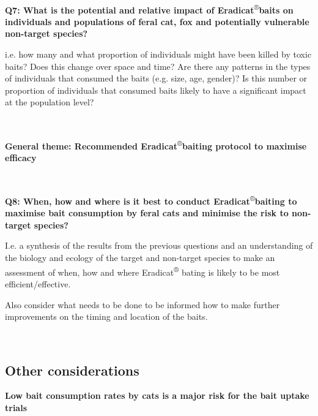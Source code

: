 \documentclass[version=last,
    paper=a4,                               %
    10pt,                                   %
    dvipsnames,
    oneside,                              %
    headings=openany,                       %
    open=any,
    BCOR=7mm,                               %
    DIV=15,     %
]{scrbook}
\begin{document}
\textbf{~}

\textbf{Q7: What is the potential and relative impact of
Eradicat}\textsuperscript{®}\textbf{baits on individuals and populations
of feral cat, fox and potentially vulnerable non-target species?}

i.e. how many and what proportion of individuals might have been killed
by toxic baits? Does this change over space and time? Are there any
patterns in the types of individuals that consumed the baits (e.g. size,
age, gender)? Is this number or proportion of individuals that consumed
baits likely to have a significant impact at the population level?

\textbf{~}

\textbf{General theme: Recommended
Eradicat}\textsuperscript{®}\textbf{baiting protocol to maximise
efficacy}

\textbf{~}

\textbf{Q8: When, how and where is it best to conduct
Eradicat}\textsuperscript{®}\textbf{baiting to maximise bait consumption
by feral cats and minimise the risk to non-target species?}

I.e. a synthesis of the results from the previous questions and an
understanding of the biology and ecology of the target and non-target
species to make an assessment of when, how and where
Eradicat\textsuperscript{®} bating is likely to be most
efficient/effective.

Also consider what needs to be done to be informed how to make further
improvements on the timing and location of the baits.

~

\subsection{Other considerations}

\textbf{Low bait consumption rates by cats is a major risk for the bait
uptake trials}
\end{document}

